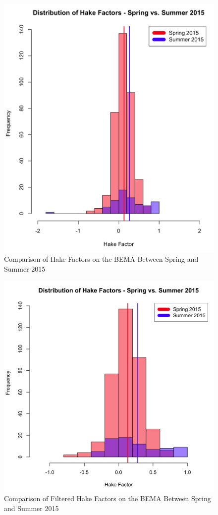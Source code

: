 \pagebreak\clearpage

\begin{figure}
	\centering
	\includegraphics[width=5in]{img/chapter4/hake_spring_vs_summer_full}
	\caption{Comparison of Hake Factors on the BEMA Between Spring and Summer 2015}
  \label{fig:hakeFull}
\end{figure}

\pagebreak\clearpage

\begin{figure}
	\centering
	\includegraphics[width=5in]{img/chapter4/hake_spring_vs_summer_filtered}
	\caption{Comparison of Filtered Hake Factors on the BEMA Between Spring and Summer 2015}
  \label{fig:hakeFiltered}
\end{figure}


